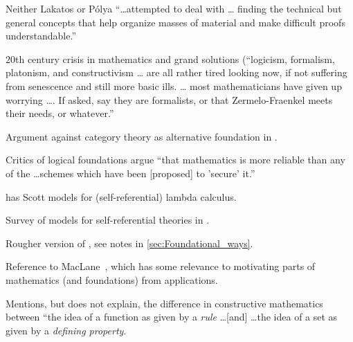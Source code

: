 Neither Lakatos or P\'{o}lya ``\ldots attempted to deal with 
\ldots
finding the technical but general concepts that 
help organize masses of material and make difficult 
proofs understandable.''

\label{sec:Foundational_ways}

\cite[ch~4 ``Foundational ways'']{Feferman1998LightOfLogic}

$20$th century crisis in mathematics and grand solutions 
(``logicism, formalism, platonism, and constructivism \ldots
are all rather tired looking now, if not suffering from
senescence and still more basic ills. \ldots
most mathematicians have given up worrying \dots .
If asked, say they are formalists, or that
Zermelo-Fraenkel meets their needs, or whatever.''

Argument against category theory as alternative 
foundation in \cite{Feferman1977Categorical}.

Critics of logical foundations argue ``that mathematics
is more reliable than any of the \ldots schemes which have been
[proposed] to 'secure' it.''

\cite[ch~4, p~99]{Feferman1998LightOfLogic} has
Scott models for (self-referential) lambda 
calculus.~\cite{scottContinuousLattices1972,
scottDataTypesLattices1976}

Survey of models for self-referential theories in 
\cite{fefermanTypeFreeTheoriesI1984}.

\label{sec:Working_foundations_1991}

\cite[ch~5 ``Working foundations 1991'']{Feferman1998LightOfLogic}

Rougher version of \cite[ch~4]{Feferman1998LightOfLogic},
see notes in \autoref{sec:Foundational_ways}.

Reference to MacLane~\cite{maclane1981mathModels},
which has some relevance to motivating
parts of mathematics (and foundations)
from applications.


Mentions, but does not explain, the difference 
in constructive mathematics between
``the idea of a function as given by a \textit{rule}
\ldots [and] \ldots the idea of a set as given by a 
\textit{defining property}.~\cite{feferman1979FunctionsClasses}

